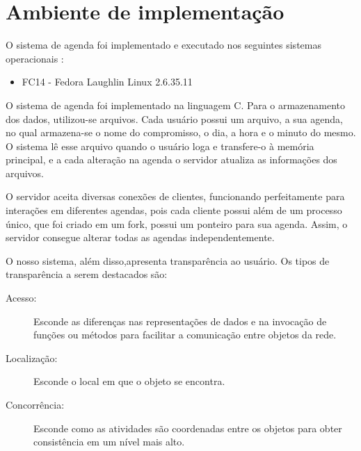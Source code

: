 \documentclass[10pt,a4paper]{article}
\begin{document}
\section{Ambiente de implementação}
O sistema de agenda foi implementado e executado nos seguintes sistemas operacionais :
\begin{itemize}
\item FC14 - Fedora Laughlin Linux 2.6.35.11
\end{itemize}

O sistema de agenda foi implementado na linguagem C.
Para o armazenamento dos dados, utilizou-se arquivos. Cada usuário
possui um arquivo, a sua agenda, no qual armazena-se o nome do
compromisso, o dia, a hora e o minuto do mesmo.
O sistema lê esse arquivo quando o usuário loga e transfere-o à
memória principal, e a cada alteração na agenda o servidor atualiza as informações dos arquivos.

O servidor aceita diversas conexões de clientes, funcionando
perfeitamente para interações em diferentes agendas, pois cada
cliente possui além de um processo único, que foi criado em um fork,
possui um ponteiro para sua agenda. Assim, o servidor consegue
alterar todas as agendas independentemente.

 O nosso sistema, além disso,apresenta
transparência ao usuário. Os tipos de transparência a serem destacados
são:

\begin{description}
\item [Acesso:] Esconde as diferenças nas representações de dados e na invocação de funções ou métodos para facilitar a comunicação entre objetos da rede.
\item [Localização:] Esconde o local em que o objeto se encontra.
\item [Concorrência:] Esconde como as atividades são coordenadas entre os objetos para obter consistência em um nível mais alto.
\end{description}
\end{document}
